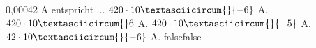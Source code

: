     {0,00042 A entspricht ...}
    {$420\cdot 10\textasciicircum{}\{-6\}$ A.}
    {$420\cdot 10\textasciicircum{}6$ A.}
    {$420\cdot 10\textasciicircum{}\{-5\}$ A.}
    {$42\cdot 10\textasciicircum{}\{-6\}$ A.}
    {false}{false}